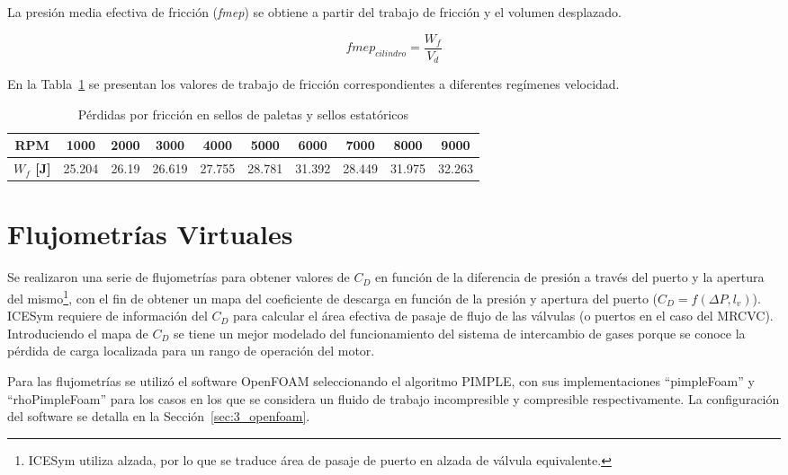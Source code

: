La presión media efectiva de fricción (\textit{fmep}) se obtiene a partir del
trabajo de fricción y el volumen desplazado.

\begin{equation}
  fmep_{cilindro} = \frac{W_{f}}{V_{d}}
\end{equation}

En la Tabla~\ref{tab:trabajo_fricción} se presentan los valores de trabajo de
fricción correspondientes a diferentes regímenes velocidad.

\begin{table}[h!]
  \centering
  \begin{tabular}{cccccccccc}
    \toprule
    \textbf{RPM} & 1000 & 2000 & 3000 & 4000 & 5000 & 6000 & 7000 & 8000 & 9000 \\
    \midrule
    \textbf{$W_{f}$ [J]} & 25.204 & 26.19 & 26.619 & 27.755 & 28.781 & 31.392 & 28.449 & 31.975 & 32.263 \\
    \bottomrule
  \end{tabular}
  \caption{Pérdidas por fricción en sellos de paletas y sellos estatóricos}\label{tab:trabajo_fricción}
\end{table}



\section{Flujometrías Virtuales}
%
Se realizaron una serie de flujometrías para obtener valores de $C_{D}$ en
función de la diferencia de presión a través del puerto y la apertura del
mismo\footnote{ICESym utiliza alzada, por lo que se traduce área de pasaje de
puerto en alzada de válvula equivalente.}, con el fin de obtener un mapa del
coeficiente de descarga en función de la presión y apertura del puerto
($C_{D} = f(\Delta P,l_v)$).
%
ICESym requiere de información del $C_{D}$ para calcular el área efectiva
de pasaje de flujo de las válvulas (o puertos en el caso del MRCVC).
%
Introduciendo el mapa de $C_{D}$ se tiene un mejor modelado del funcionamiento
del sistema de intercambio de gases porque se conoce la pérdida de carga
localizada para un rango de operación del motor.

Para las flujometrías se utilizó el software OpenFOAM seleccionando el algoritmo
PIMPLE, con sus implementaciones ``pimpleFoam'' y ``rhoPimpleFoam'' para los
casos en los que se considera un fluido de trabajo incompresible y compresible
respectivamente.
%
La configuración del software se detalla en la Sección~\ref{sec:3_openfoam}.

